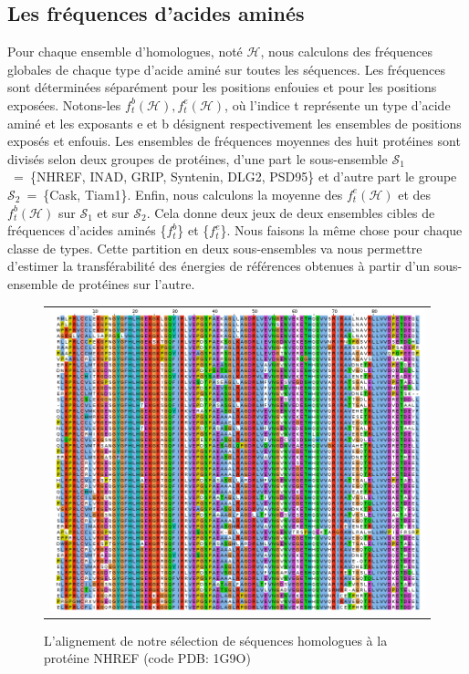 \subsection{Les fréquences d'acides aminés}

Pour chaque ensemble d'homologues, noté $\mathcal{H}$, nous calculons des fréquences globales de chaque type d'acide aminé sur toutes les séquences. Les fréquences sont déterminées séparément pour les positions enfouies et pour les positions exposées. Notons-les ${f^b_t(\mathcal{H}), f^e_t(\mathcal{H})}$, où l'indice t représente un type d'acide aminé et les exposants e et b désignent respectivement les ensembles de positions exposés et enfouis. Les ensembles de fréquences moyennes des huit protéines sont divisés selon deux groupes de protéines, d'une part le sous-ensemble $\mathcal{S}_1$~=~\{NHREF, INAD, GRIP, Syntenin, DLG2, PSD95\} et d'autre part le groupe $\mathcal{S}_2$~=~\{Cask, Tiam1\}. Enfin, nous calculons la moyenne des $f^e_t(\mathcal{H})$ et des $f^b_t(\mathcal{H})$ sur $\mathcal{S}_1$ et sur $\mathcal{S}_2$. Cela donne deux jeux de deux ensembles cibles de fréquences d'acides aminés \{$f^b_t$\} et \{$f^e_t$\}. Nous faisons la même chose pour chaque classe de types. Cette partition en deux sous-ensembles va nous permettre d'estimer la transférabilité des énergies de références obtenues à partir d'un sous-ensemble de protéines sur l'autre.
\label{subsection:freqaa}
        

   \begin{figure}[t]
     \centering
     \begin{tabular}{c}
       \includegraphics[width=17cm]{homologues/1G9O.png} \\
     \end{tabular}
     \caption{L'alignement de notre sélection de séquences homologues à la protéine NHREF (code PDB: 1G9O)}
\label{align_homo:NHREF}
   \end{figure}

